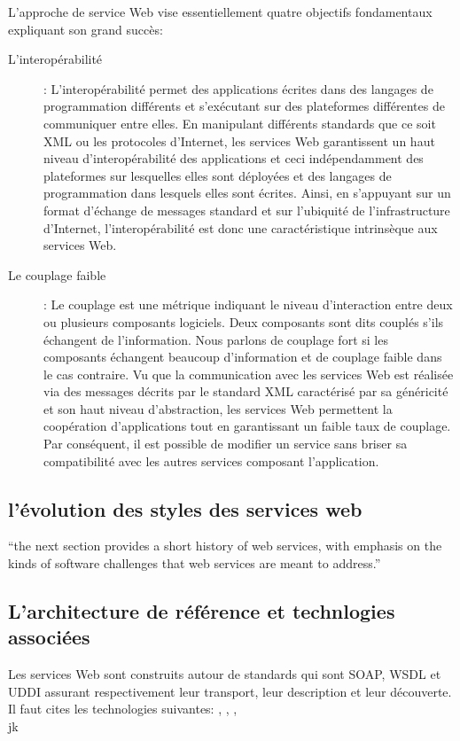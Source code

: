	L'approche de service Web vise essentiellement quatre objectifs fondamentaux expliquant son grand succès:\\
	\begin{description}
	    \item[L'interopérabilité] : L'interopérabilité permet des applications écrites dans des langages 
		de programmation différents et s’exécutant sur des plateformes différentes de communiquer entre elles. 
		En manipulant différents standards que ce soit XML ou les protocoles d’Internet, les services Web garantissent
		un haut niveau d’interopérabilité des applications et ceci indépendamment des plateformes sur lesquelles 
		elles sont déployées et des langages de programmation dans lesquels elles sont écrites. Ainsi,
		en s’appuyant sur un format d’échange de messages standard et sur l'ubiquité de l'infrastructure d’Internet,
		l'interopérabilité est donc une caractéristique intrinsèque aux services Web.

	    \item[Le couplage faible] : Le couplage est une métrique indiquant le niveau d’interaction entre deux ou plusieurs
		composants logiciels. Deux composants sont dits couplés s’ils échangent de l'information. Nous parlons 
		de couplage fort si les composants échangent beaucoup d’information et de couplage faible dans le cas contraire. 
		Vu que la communication avec les services Web est réalisée via des messages décrits par le standard XML 
		caractérisé par sa généricité et son haut niveau d’abstraction, les services Web permettent la coopération 
		d’applications tout en garantissant un faible taux de couplage.  Par conséquent, il est possible de modifier
		un service sans briser sa compatibilité avec les autres services composant l'application.
	\end{description}


    \subsection{l'évolution des styles des services web}
	``the next section provides a short history of web services, with emphasis on the kinds of software challenges
	that web services are meant to address.''

    \subsection{L'architecture de référence et technlogies associées}
	Les services Web sont construits autour de standards qui sont SOAP, WSDL et UDDI assurant respectivement leur
	transport, leur description et leur découverte.\\
	Il faut cites les technologies suivantes: \cite{w3c_ws_arch:2014:Misc}, \cite{soap_1.2_primer:2014:Misc}
	\cite{wsdl1.1:2014:Misc}, \cite{wsdl20:2014:Misc}, \cite{bray1998extensible} \\jk

